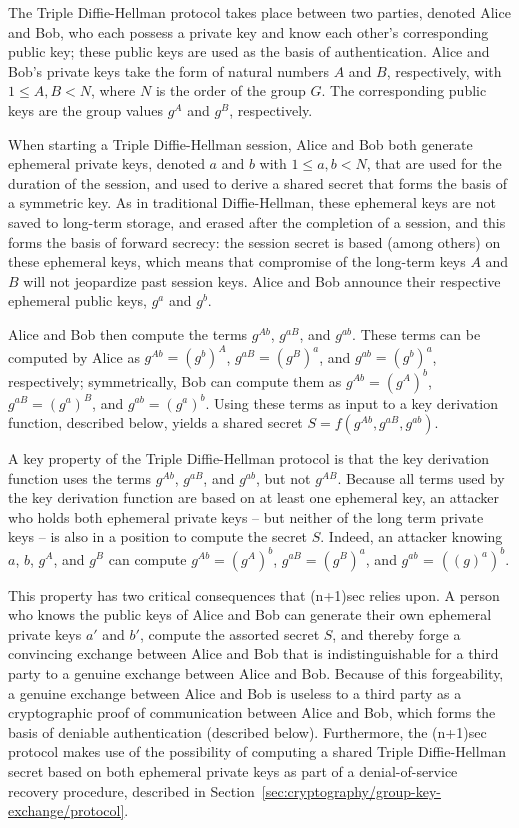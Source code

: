 \documentclass{article}
\begin{document}
The Triple Diffie-Hellman protocol takes place between two parties, denoted Alice and Bob, who each possess a private key and know each other's corresponding public key; these public keys are used as the basis of authentication.
Alice and Bob's private keys take the form of natural numbers $A$ and $B$, respectively, with $1 \leq A, B < N$, where $N$ is the order of the group $G$.
The corresponding public keys are the group values $g^A$ and $g^B$, respectively.

When starting a Triple Diffie-Hellman session, Alice and Bob both generate ephemeral private keys, denoted $a$ and $b$ with $1 \leq a, b < N$, that are used for the duration of the session, and used to derive a shared secret that forms the basis of a symmetric key.
As in traditional Diffie-Hellman, these ephemeral keys are not saved to long-term storage, and erased after the completion of a session, and this forms the basis of forward secrecy: the session secret is based (among others) on these ephemeral keys, which means that compromise of the long-term keys $A$ and $B$ will not jeopardize past session keys.
Alice and Bob announce their respective ephemeral public keys, $g^a$ and $g^b$.

Alice and Bob then compute the terms $g^{Ab}$, $g^{aB}$, and $g^{ab}$.
These terms can be computed by Alice as $g^{Ab} = (g^b)^A$, $g^{aB} = (g^B)^a$, and $g^{ab} = (g^b)^a$, respectively; symmetrically, Bob can compute them as $g^{Ab} = (g^A)^b$, $g^{aB} = (g^a)^B$, and $g^{ab} = (g^a)^b$.
Using these terms as input to a key derivation function, described below, yields a shared secret $S = f(g^{Ab}, g^{aB}, g^{ab})$.

A key property of the Triple Diffie-Hellman protocol is that the key derivation function uses the terms $g^{Ab}$, $g^{aB}$, and $g^{ab}$, but not $g^{AB}$.
Because all terms used by the key derivation function are based on at least one ephemeral key, an attacker who holds both ephemeral private keys -- but neither of the long term private keys -- is also in a position to compute the secret $S$.
Indeed, an attacker knowing $a$, $b$, $g^A$, and $g^B$ can compute $g^{Ab} = (g^A)^b$, $g^{aB} = (g^B)^a$, and $g^{ab}$ = $((g)^a)^b$.

This property has two critical consequences that (n+1)sec relies upon.
A person who knows the public keys of Alice and Bob can generate their own ephemeral private keys $a'$ and $b'$, compute the assorted secret $S$, and thereby forge a convincing exchange between Alice and Bob that is indistinguishable for a third party to a genuine exchange between Alice and Bob.
Because of this forgeability, a genuine exchange between Alice and Bob is useless to a third party as a cryptographic proof of communication between Alice and Bob, which forms the basis of deniable authentication (described below).
Furthermore, the (n+1)sec protocol makes use of the possibility of computing a shared Triple Diffie-Hellman secret based on both ephemeral private keys as part of a denial-of-service recovery procedure, described in Section~\ref{sec:cryptography/group-key-exchange/protocol}.
\end{document}

